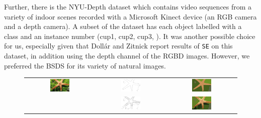 Further, there is the NYU-Depth dataset \cite{Silberman2012} which contains video sequences from a variety of indoor scenes recorded with a Microsoft Kinect device (\ie an RGB camera and a depth camera). A subset of the dataset has each object labelled with a class and an instance number (\eg cup1, cup2, cup3, \etc). %
It was another possible choice for us, especially given that Doll{\'a}r and Zitnick report results of {\tt SE} on this dataset, in addition using %
the depth channel of the RGBD images. However, we preferred the BSDS for its variety of %
natural images.

\begin{figure}[t]
\begin{center}
  \begin{tabular}{ c c c }
  \includegraphics[width=0.3\textwidth]{images/examples/starfish/starfish.png} &
  \includegraphics[width=0.3\textwidth,frame]{images/examples/starfish/starfish_bdry_coarse.png} &
  \includegraphics[width=0.3\textwidth]{images/examples/starfish/starfish_segm_coarse.png} \\
  &
  \includegraphics[width=0.3\textwidth,frame]{images/examples/starfish/starfish_bdry_detail.png} &
  \includegraphics[width=0.3\textwidth]{images/examples/starfish/starfish_segm_detail.png} \\

\end{tabular}
\end{center}
\end{figure}
